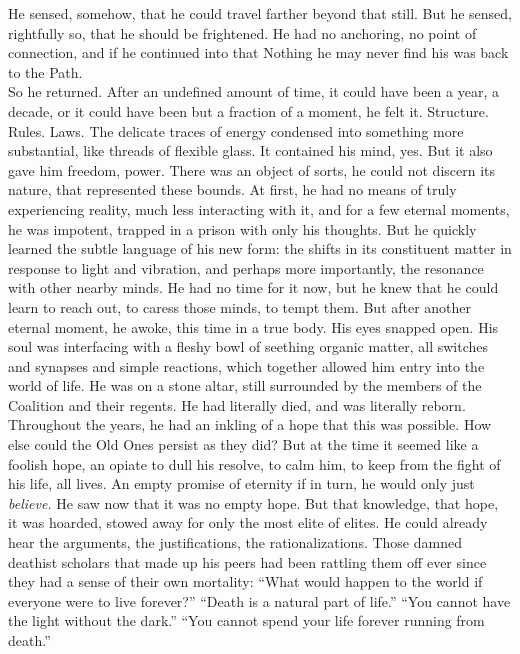 He sensed, somehow, that he could travel farther beyond that still. But he sensed, rightfully so, that he should be frightened. He had no anchoring, no point of connection, and if he continued into that Nothing he may never find his was back to the Path.\\So he returned.
\SmallVSpace
After an undefined amount of time, it could have been a year, a decade, or it could have been but a fraction of a moment, he felt it. Structure. Rules. Laws. The delicate traces of energy condensed into something more substantial, like threads of flexible glass. It contained his mind, yes. But it also gave him freedom, power. There was an object of sorts, he could not discern its nature, that represented these bounds.
\SmallVSpace
At first, he had no means of truly experiencing reality, much less interacting with it, and for a few eternal moments, he was impotent, trapped in a prison with only his thoughts. But he quickly learned the subtle language of his new form: the shifts in its constituent matter in response to light and vibration, and perhaps more importantly, the resonance with other nearby minds. He had no time for it now, but he knew that he could learn to reach out, to caress those minds, to tempt them.
\SmallVSpace
But after another eternal moment, he awoke, this time in a true body. His eyes snapped open. His soul was interfacing with a fleshy bowl of seething organic matter, all switches and synapses and simple reactions, which together allowed him entry into the world of life. He was on a stone altar, still surrounded by the members of the Coalition and their regents. He had literally died, and was literally reborn.
\SmallVSpace
Throughout the years, he had an inkling of a hope that this was possible. How else could the Old Ones persist as they did? But at the time it seemed like a foolish hope, an opiate to dull his resolve, to calm him, to keep from the fight of his life, all lives. An empty promise of eternity if in turn, he would only just \emph{believe.}
\SomeVSpace
He saw now that it was no empty hope. But that knowledge, that hope, it was hoarded, stowed away for only the most elite of elites. He could already hear the arguments, the justifications, the rationalizations. Those damned deathist scholars that made up his peers had been rattling them off ever since they had a sense of their own mortality:
\SmallVSpace
“What would happen to the world if everyone were to live forever?”
\SmallVSpace
“Death is a natural part of life.”
\SmallVSpace
“You cannot have the light without the dark.”
\SmallVSpace
“You cannot spend your life forever running from death.”
